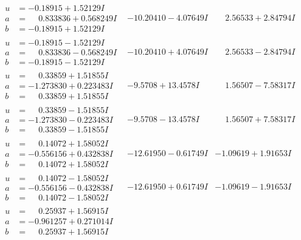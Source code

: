 \documentclass[1p]{elsarticle_modified}
\theoremstyle{definition}
\begin{document}
$$\begin{array}{c|c|c}
\begin{aligned}
u &= -0.18915 + 1.52129 I \\
a &= \phantom{-}0.833836 + 0.568249 I \\
b &= -0.18915 + 1.52129 I\end{aligned}
 & -10.20410 - 4.07649 I & \phantom{-}2.56533 + 2.84794 I \\ \hline\begin{aligned}
u &= -0.18915 - 1.52129 I \\
a &= \phantom{-}0.833836 - 0.568249 I \\
b &= -0.18915 - 1.52129 I\end{aligned}
 & -10.20410 + 4.07649 I & \phantom{-}2.56533 - 2.84794 I \\ \hline\begin{aligned}
u &= \phantom{-}0.33859 + 1.51855 I \\
a &= -1.273830 + 0.223483 I \\
b &= \phantom{-}0.33859 + 1.51855 I\end{aligned}
 & -9.5708 + 13.4578 I & \phantom{-}1.56507 - 7.58317 I \\ \hline\begin{aligned}
u &= \phantom{-}0.33859 - 1.51855 I \\
a &= -1.273830 - 0.223483 I \\
b &= \phantom{-}0.33859 - 1.51855 I\end{aligned}
 & -9.5708 - 13.4578 I & \phantom{-}1.56507 + 7.58317 I \\ \hline\begin{aligned}
u &= \phantom{-}0.14072 + 1.58052 I \\
a &= -0.556156 + 0.432838 I \\
b &= \phantom{-}0.14072 + 1.58052 I\end{aligned}
 & -12.61950 - 0.61749 I & -1.09619 + 1.91653 I \\ \hline\begin{aligned}
u &= \phantom{-}0.14072 - 1.58052 I \\
a &= -0.556156 - 0.432838 I \\
b &= \phantom{-}0.14072 - 1.58052 I\end{aligned}
 & -12.61950 + 0.61749 I & -1.09619 - 1.91653 I \\ \hline\begin{aligned}
u &= \phantom{-}0.25937 + 1.56915 I \\
a &= -0.961257 + 0.271014 I \\
b &= \phantom{-}0.25937 + 1.56915 I\end{aligned}

\end{array}$$
\end{document}

